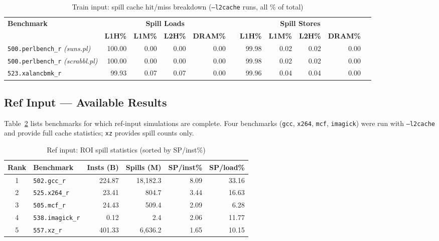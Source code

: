 \documentclass[11pt,a4paper]{article}
\begin{document}
\begin{table}[H]
\centering
\caption{Train input: spill cache hit/miss breakdown (\texttt{--l2cache} runs, all \% of total)}
\label{tab:sum_train_cache}
\small
\begin{tabular}{lrrrrrrrrrr}
\toprule
\multirow{2}{*}{\textbf{Benchmark}} &
\multicolumn{4}{c}{\textbf{Spill Loads}} & \phantom{x} &
\multicolumn{4}{c}{\textbf{Spill Stores}} \\
\cmidrule{2-5}\cmidrule{7-10}
 & \textbf{L1H\%} & \textbf{L1M\%} & \textbf{L2H\%} & \textbf{DRAM\%} &
   & \textbf{L1H\%} & \textbf{L1M\%} & \textbf{L2H\%} & \textbf{DRAM\%} \\
\midrule
\texttt{500.perlbench\_r} \textit{(suns.pl)} & 100.00 & 0.00 & 0.00 & 0.00 & & 99.98 & 0.02 & 0.02 & 0.00 \\
\texttt{500.perlbench\_r} \textit{(scrabbl.pl)} & 100.00 & 0.00 & 0.00 & 0.00 & & 99.98 & 0.02 & 0.02 & 0.00 \\
\texttt{523.xalancbmk\_r} & 99.93 & 0.07 & 0.07 & 0.00 & & 99.96 & 0.04 & 0.04 & 0.00 \\
\bottomrule
\end{tabular}
\end{table}


\subsection{Ref Input --- Available Results}
\label{subsec:summary_ref}

Table~\ref{tab:sum_ref_spill} lists benchmarks for which ref-input
simulations are complete.  Four benchmarks (\texttt{gcc}, \texttt{x264},
\texttt{mcf}, \texttt{imagick}) were run with \texttt{--l2cache} and
provide full cache statistics; \texttt{xz} provides spill counts only.

\begin{table}[H]
\centering
\caption{Ref input: ROI spill statistics (sorted by SP/inst\%)}
\label{tab:sum_ref_spill}
\small
\begin{tabular}{clrrrr}
\toprule
\textbf{Rank} & \textbf{Benchmark} & \textbf{Insts (B)} & \textbf{Spills (M)}
  & \textbf{SP/inst\%} & \textbf{SP/load\%} \\
\midrule
1 & \texttt{502.gcc\_r} & 224.87 & 18,182.3 & 8.09 & 33.16 \\
2 & \texttt{525.x264\_r} & 23.41 & 804.7 & 3.44 & 16.63 \\
3 & \texttt{505.mcf\_r} & 24.43 & 509.4 & 2.09 & 6.28 \\
4 & \texttt{538.imagick\_r} & 0.12 & 2.4 & 2.06 & 11.77 \\
5 & \texttt{557.xz\_r} & 401.33 & 6,636.2 & 1.65 & 10.15 \\
\bottomrule
\end{tabular}
\end{table}
\end{document}
